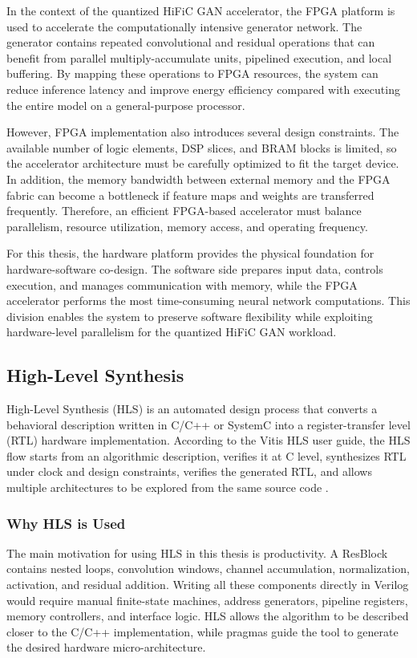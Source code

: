 In the context of the quantized HiFiC GAN accelerator, the FPGA platform is used to accelerate the computationally intensive generator network. The generator contains repeated convolutional and residual operations that can benefit from parallel multiply-accumulate units, pipelined execution, and local buffering. By mapping these operations to FPGA resources, the system can reduce inference latency and improve energy efficiency compared with executing the entire model on a general-purpose processor.

However, FPGA implementation also introduces several design constraints. The available number of logic elements, DSP slices, and BRAM blocks is limited, so the accelerator architecture must be carefully optimized to fit the target device. In addition, the memory bandwidth between external memory and the FPGA fabric can become a bottleneck if feature maps and weights are transferred frequently. Therefore, an efficient FPGA-based accelerator must balance parallelism, resource utilization, memory access, and operating frequency.

For this thesis, the hardware platform provides the physical foundation for hardware-software co-design. The software side prepares input data, controls execution, and manages communication with memory, while the FPGA accelerator performs the most time-consuming neural network computations. This division enables the system to preserve software flexibility while exploiting hardware-level parallelism for the quantized HiFiC GAN workload.


\subsection{High-Level Synthesis}

High-Level Synthesis (HLS) is an automated design process that converts a behavioral description written in C/C++ or SystemC into a register-transfer level (RTL) hardware implementation. According to the Vitis HLS user guide, the HLS flow starts from an algorithmic description, verifies it at C level, synthesizes RTL under clock and design constraints, verifies the generated RTL, and allows multiple architectures to be explored from the same source code \cite{amd2026vitisHls}.

\subsubsection{Why HLS is Used}

The main motivation for using HLS in this thesis is productivity. A ResBlock contains nested loops, convolution windows, channel accumulation, normalization, activation, and residual addition. Writing all these components directly in Verilog would require manual finite-state machines, address generators, pipeline registers, memory controllers, and interface logic. HLS allows the algorithm to be described closer to the C/C++ implementation, while pragmas guide the tool to generate the desired hardware micro-architecture.

